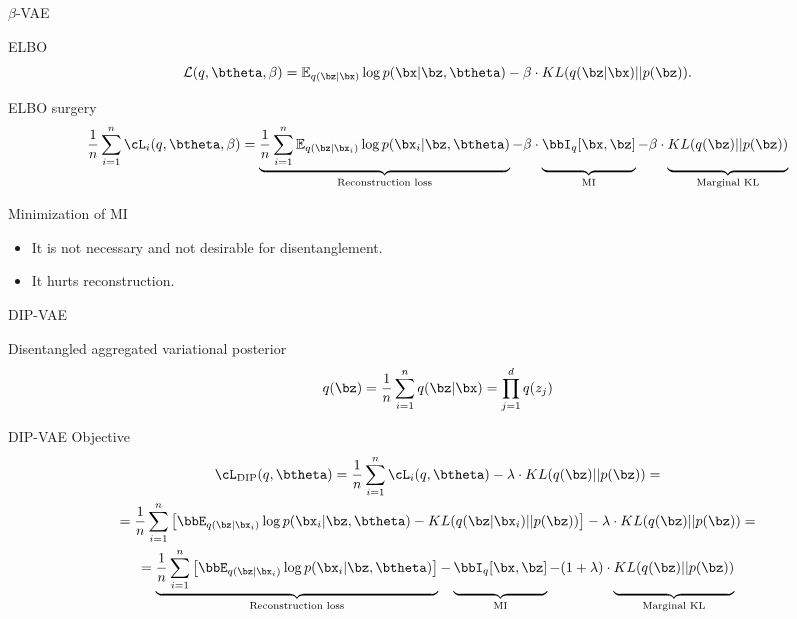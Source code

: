 \begin{frame}{$\beta$-VAE}
	\begin{block}{ELBO}
		\vspace{-0.2cm}
		\[
		\mathcal{L}(q, \btheta, \beta) = \mathbb{E}_{q(\bz | \bx)} \log p(\bx | \bz, \btheta) - \beta \cdot KL(q(\bz | \bx) || p(\bz)).
		\]
		\vspace{-0.4cm}
	\end{block}
	\begin{block}{ELBO surgery}
		\vspace{-0.3cm}
		{\footnotesize
			\[
			\frac{1}{n} \sum_{i=1}^n \cL_i(q, \btheta, \beta) = \underbrace{\frac{1}{n} \sum_{i=1}^n \mathbb{E}_{q(\bz | \bx_i)} \log p(\bx_i | \bz, \btheta)}_{\text{Reconstruction loss}} - \beta \cdot \underbrace{\bbI_{q} [\bx, \bz]\vphantom{\sum_{i=1}}}_{\text{MI}} - \beta \cdot \underbrace{KL(q(\bz) || p(\bz))\vphantom{\sum_{i=1}}}_{\text{Marginal KL}}
			\]}
	\end{block}
	\begin{block}{Minimization of MI}
	\begin{itemize}
		\item It is not necessary and not desirable for disentanglement. 
		\item It hurts reconstruction.
	\end{itemize}
	\end{block}
\end{frame}
\begin{frame}{DIP-VAE}
	\begin{block}{Disentangled aggregated variational posterior}
		\vspace{-0.3cm}
		\[
		q(\bz) = \frac{1}{n} \sum_{i=1}^n q(\bz | \bx) = \prod_{j=1}^d q(z_j)
		\]
		\vspace{-0.3cm}
	\end{block}
	\begin{block}{DIP-VAE Objective}
		\vspace{-0.3cm}
		{\footnotesize
			\begin{multline*}
			\cL_{\text{DIP}}(q, \btheta) = \frac{1}{n} \sum_{i=1}^n \cL_i(q, \btheta) -\lambda \cdot KL(q(\bz) || p(\bz)) = \\
			= \frac{1}{n} \sum_{i=1}^n\left[ \bbE_{q(\bz | \bx_i)} \log p(\bx_i | \bz, \btheta) - KL(q(\bz | \bx_i) || p(\bz)) \right] -\lambda \cdot KL(q(\bz) || p(\bz)) = \\
			= \underbrace{ \frac{1}{n} \sum_{i=1}^n \left[\bbE_{q(\bz | \bx_i)} \log p(\bx_i | \bz, \btheta)\right]}_{\text{Reconstruction loss}} - \underbrace{\vphantom{\sum_{i=1}^n} \bbI_{q} [\bx, \bz]}_{\text{MI}} - (1 + \lambda) \cdot \underbrace{\vphantom{\sum_{i=1}^n} KL(q(\bz) || p(\bz))}_{\text{Marginal KL}}
			\end{multline*}
		}
		\vspace{-0.3cm}
	\end{block}

\end{frame}
